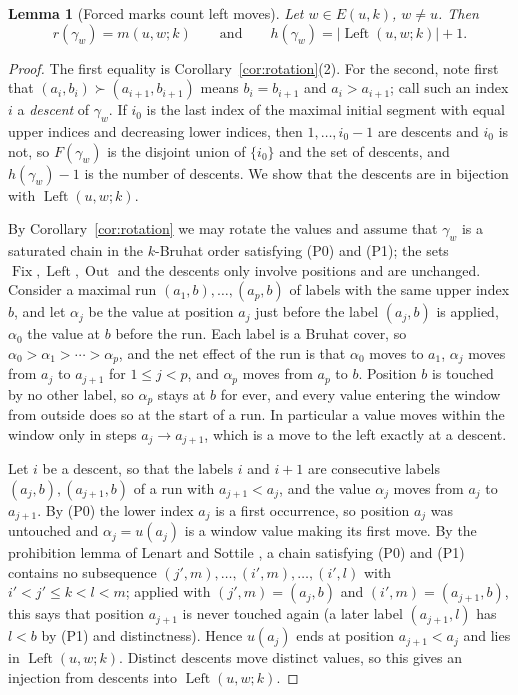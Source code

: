 \documentclass[11pt]{article}
\newtheorem{lemma}[proposition]{Lemma}
\newcommand{\Fix}{\operatorname{Fix}}
\newcommand{\Left}{\operatorname{Left}}
\newcommand{\Out}{\operatorname{Out}}
\begin{document}
\begin{lemma}[Forced marks count left moves]\label{lem:h-left}
Let $w\in E(u,k)$, $w\neq u$. Then
\[
 r(\gamma_w)=m(u,w;k)
 \qquad\text{and}\qquad
 h(\gamma_w)=|\Left(u,w;k)|+1 .
\]
\end{lemma}

\begin{proof}
The first equality is Corollary~\ref{cor:rotation}(2). For the
second, note first that $(a_i,b_i)\succ(a_{i+1},b_{i+1})$ means
$b_i=b_{i+1}$ and $a_i>a_{i+1}$; call such an index $i$ a
\emph{descent} of $\gamma_w$. If $i_0$ is the last index of the
maximal initial segment with equal upper indices and decreasing lower
indices, then $1,\ldots,i_0-1$ are descents and $i_0$ is not, so
$F(\gamma_w)$ is the disjoint union of $\{i_0\}$ and the set of
descents, and $h(\gamma_w)-1$ is the number of descents. We show that
the descents are in bijection with $\Left(u,w;k)$.

By Corollary~\ref{cor:rotation} we may rotate the values and assume
that $\gamma_w$ is a saturated chain in the $k$-Bruhat order
satisfying (P0) and (P1); the sets $\Fix,\Left,\Out$ and the
descents only involve positions and are unchanged. Consider a
maximal run $(a_1,b),\ldots,(a_p,b)$ of labels with the same upper
index $b$, and let $\alpha_j$ be the value at position $a_j$ just
before the label $(a_j,b)$ is applied, $\alpha_0$ the value at $b$
before the run. Each label is a Bruhat cover, so
$\alpha_0>\alpha_1>\cdots>\alpha_p$, and the net effect of the run is
that $\alpha_0$ moves to $a_1$, $\alpha_j$ moves from $a_j$ to
$a_{j+1}$ for $1\leq j<p$, and $\alpha_p$ moves from $a_p$ to $b$.
Position $b$ is touched by no other label, so $\alpha_p$ stays at
$b$ for ever, and every value entering the window from outside does
so at the start of a run. In particular a value moves within the
window only in steps $a_j\to a_{j+1}$, which is a move to the left
exactly at a descent.

Let $i$ be a descent, so that the labels $i$ and $i+1$ are consecutive
labels $(a_j,b),(a_{j+1},b)$ of a run with $a_{j+1}<a_j$, and the
value $\alpha_j$ moves from $a_j$ to $a_{j+1}$. By (P0) the lower index
$a_j$ is a first occurrence, so position $a_j$ was untouched and
$\alpha_j=u(a_j)$ is a window value making its first move. By the
prohibition lemma of Lenart and Sottile
\cite[Lemma~2.9]{lenart2007pieri}, a chain satisfying (P0) and (P1)
contains no subsequence $(j',m),\ldots,(i',m),\ldots,(i',l)$ with
$i'<j'\leq k<l<m$; applied with $(j',m)=(a_j,b)$ and
$(i',m)=(a_{j+1},b)$, this says that position $a_{j+1}$ is never
touched again (a later label $(a_{j+1},l)$ has $l<b$ by (P1) and
distinctness). Hence $u(a_j)$ ends at position $a_{j+1}<a_j$ and lies
in $\Left(u,w;k)$. Distinct descents move distinct values, so this
gives an injection from descents into $\Left(u,w;k)$.


\end{proof}
\end{document}
